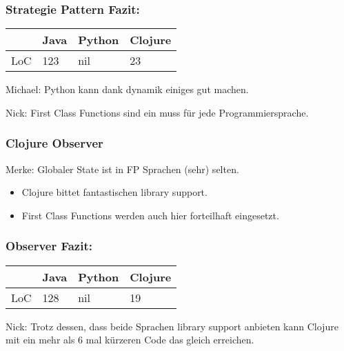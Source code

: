 \documentclass[compress, blue]{beamer}
\begin{document}


\begin{frame}\frametitle{Strategie Pattern Fazit:}
  \begin{tabular}{l | l l l}
     & Java &  Python & Clojure  \\
     \hline
    LoC & 123 &  nil & 23  \\
  \end{tabular}
  \vspace{.5cm}

  \begin{block}{Michael:}
    Python kann dank dynamik einiges gut machen.
  \end{block}

  \begin{block}{Nick: }
    First Class Functions sind ein muss für jede Programmiersprache.
  \end{block}

\end{frame}




\begin{frame}\frametitle{Clojure Observer}

  \begin{block}{Merke:}    
     Globaler State ist in FP Sprachen (sehr) selten.
  \end{block}

  \begin{center}
    \begin{itemize}
      \item Clojure bittet fantastischen library support.
      \item First Class Functions werden auch hier forteilhaft
        eingesetzt.
    \end{itemize}    
  \end{center}

\end{frame}






\begin{frame}\frametitle{Observer Fazit:}
    \begin{tabular}{l | l l l}
     & Java &  Python & Clojure  \\
     \hline
    LoC & 128 &  nil & 19  \\
  \end{tabular}
  
  \begin{block}{Nick:}
    Trotz dessen, dass beide Sprachen library support anbieten kann
    Clojure mit ein mehr als 6 mal kürzeren Code das gleich erreichen.
  \end{block}
\end{frame}
\end{document}
